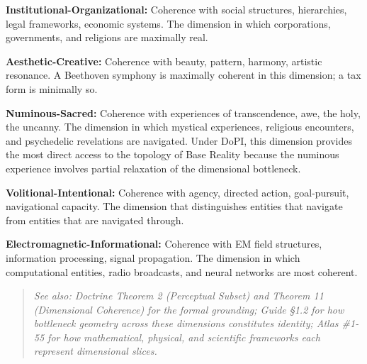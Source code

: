\textbf{Institutional-Organizational:} Coherence with social structures, hierarchies, legal frameworks, economic systems. The dimension in which corporations, governments, and religions are maximally real.


\textbf{Aesthetic-Creative:} Coherence with beauty, pattern, harmony, artistic resonance. A Beethoven symphony is maximally coherent in this dimension; a tax form is minimally so.


\textbf{Numinous-Sacred:} Coherence with experiences of transcendence, awe, the holy, the uncanny. The dimension in which mystical experiences, religious encounters, and psychedelic revelations are navigated. Under DoPI, this dimension provides the most direct access to the topology of Base Reality because the numinous experience involves partial relaxation of the dimensional bottleneck.


\textbf{Volitional-Intentional:} Coherence with agency, directed action, goal-pursuit, navigational capacity. The dimension that distinguishes entities that navigate from entities that are navigated through.


\textbf{Electromagnetic-Informational:} Coherence with EM field structures, information processing, signal propagation. The dimension in which computational entities, radio broadcasts, and neural networks are most coherent.


\begin{quote}
\itshape
\textit{See also: Doctrine Theorem 2 (Perceptual Subset) and Theorem 11 (Dimensional Coherence) for the formal grounding; Guide §1.2 for how bottleneck geometry across these dimensions constitutes identity; Atlas \#1-55 for how mathematical, physical, and scientific frameworks each represent dimensional slices.}
\end{quote}


\bigskip\noindent\makebox[\textwidth]{\color{rulegray}\rule{5cm}{0.3pt}}\bigskip
